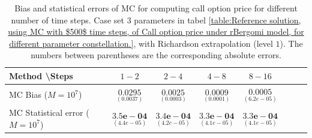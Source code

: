 \begin{table}[h!]
	\centering
	\begin{tabular}{l*{6}{c}r}
		Method \textbackslash  Steps            & $1-2$ & $2-4$ & $4-8$ & $8-16$  \\
		\hline
		MC Bias ($M=10^7$)  &$\underset{(  0.0037
			)}{\mathbf{0.0295}}$  & $\underset{( 0.0003)}{\mathbf{0.0025}}$  & $\underset{(   0.0001)}{\mathbf{0.0009}}$  & $\underset{(  6.2e-05)}{\mathbf{0.0005}}$ \\	
		
		MC Statistical error ($M=10^7$)   & $\underset{(  4.4e-05)}{\mathbf{3.5e-04}}$  & $\underset{(   4.2e-05)}{\mathbf{3.4e-04}}$  & $\underset{(  4.1e-05)}{\mathbf{3.3e-04}}$ & $\underset{(  4.1e-05)}{\mathbf{3.3e-04}}$ \\	
	
		\hline
	\end{tabular}
	\caption{Bias and statistical errors of MC   for computing call option price  for different number of time steps. Case set $3$ parameters in tabel \ref{table:Reference solution, using MC with $500$ time steps, of Call option price under rBergomi model, for different parameter constellation.}, with Richardson extrapolation (level $1$). The numbers between parentheses are the corresponding absolute errors.}
	\label{Bias and Statistical errors of MC ($M=10^7$)  for computing Call option price  for different number of time steps. Case set $3$ parameters, with Richardson extrapolation (level1). The numbers between parentheses are the corresponding absolute errors.}
\end{table}



\FloatBarrier




